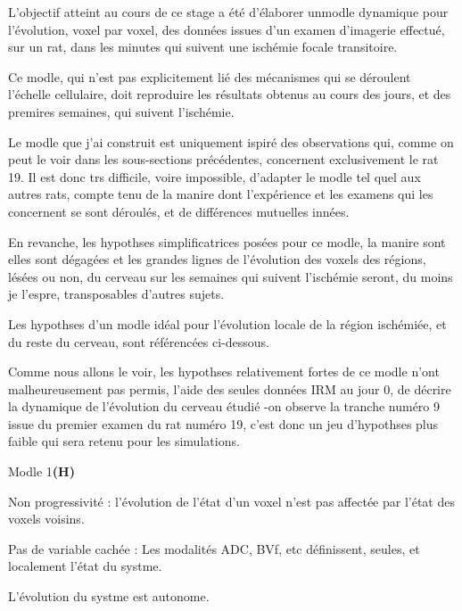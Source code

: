 L'objectif atteint au cours de ce stage a \'et\'e d'\'elaborer unmodle dynamique pour l'\'evolution, voxel par voxel, %
des donn\'ees issues d'un examen d'imagerie effectu\'e, sur un rat, dans les minutes qui suivent une isch\'emie focale transitoire.

\par
Ce modle, qui n'est pas explicitement li\'e  des m\'ecanismes qui se d\'eroulent  l'\'echelle cellulaire, %
doit reproduire les r\'esultats obtenus au cours des jours, et des premires semaines, qui suivent l'isch\'emie.

\par
Le modle que j'ai construit est uniquement ispir\'e des observations qui, comme on peut le voir dans les sous-sections pr\'ec\'edentes, %
concernent exclusivement le rat 19. %
Il est donc trs difficile, voire impossible, d'adapter le modle tel quel aux autres rats, %
compte tenu de la manire dont l'exp\'erience et les examens qui les concernent se sont d\'eroul\'es, %
et de diff\'erences mutuelles inn\'ees.

\par
En revanche, les hypothses simplificatrices pos\'ees pour ce modle, la manire sont elles sont d\'egag\'ees %
et les grandes lignes de l'\'evolution des voxels des r\'egions, l\'es\'ees ou non, du cerveau sur les semaines qui suivent l'isch\'emie seront, %
du moins je l'espre, transposables  d'autres sujets.

\etoile

Les hypothses d'un modle \og{} id\'eal\fg{} pour l'\'evolution locale de la r\'egion isch\'emi\'ee, et du reste du cerveau, %
sont r\'ef\'erenc\'ees ci-dessous.

\par
Comme nous allons le voir, les hypothses relativement fortes de ce modle n'ont malheureusement pas permis,  l'aide des seules donn\'ees IRM au jour 0, %
de d\'ecrire la dynamique de l'\'evolution du cerveau \'etudi\'e -on observe la tranche num\'ero 9 issue du premier examen du rat num\'ero 19, %
c'est donc un jeu d'hypothses plus faible qui sera retenu pour les simulations.


\begin{modmerate}{Modle 1}{\textbf{(H\arabic*)}}
\item\label{nprog} Non progressivit\'e : l'\'evolution de l'\'etat d'un voxel n'est pas affect\'ee par l'\'etat des voxels voisins.
\item\label{var_comp} Pas de variable cach\'ee : Les modalit\'es ADC, BVf, etc d\'efinissent, seules, et localement l'\'etat du systme.
\item\label{auto} L'\'evolution du systme est autonome.
\end{modmerate}

